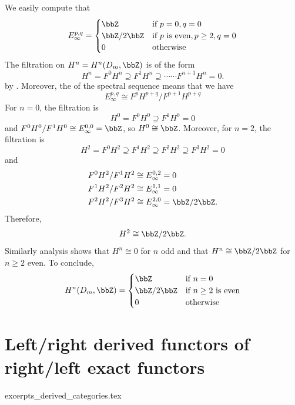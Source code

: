 \begin{example}
    We easily compute that 
    $$E_\infty^{p,q} = \begin{cases} \bbZ &\text{if } p = 0, q = 0 \\ \bbZ / 2 \bbZ &\text{if } p \text{ is even}, p \geq 2, q = 0 \\ 0 &\text{otherwise} \end{cases} $$
    The filtration on $H^n = H^n(D_m, \bbZ)$ is of the form 
    $$H^n = F^0 H^n \supseteq F^1 H^n \supseteq \cdots \cdots F^{n+1} H^n = 0.$$
    by . Moreover, the  of the spectral sequence means that we have 
    $$E^{p,q}_\infty \cong F^{p} H^{p+q} / F^{p+1} H^{p+q}$$
    For $n = 0$, the filtration is 
    $$H^0 = F^0 H^0 \supseteq F^1 H^0 = 0$$
    and $F^0 H^{0} / F^1 H^0 \cong E^{0,0}_\infty = \bbZ$, so $H^0 \cong \bbZ$. Moreover, for $n = 2$, the filtration is 
    $$H^2 = F^0 H^2 \supseteq F^1 H^2 \supseteq F^2 H^2 \supseteq F^3 H^2 = 0$$
    and 
    \begin{align*}
    F^0 H^2 / F^1 H^2 \cong E_\infty^{0,2} &= 0 \\ 
    F^1 H^2 / F^2 H^2 \cong E_\infty^{1,1} &= 0 \\ 
    F^2 H^2 / F^3 H^2 \cong E_\infty^{2,0} &= \bbZ/2\bbZ.
    \end{align*}
    Therefore, 
    $$H^2 \cong \bbZ/2\bbZ.$$
    Similarly analysis shows that $H^n \cong 0$ for $n$ odd and that $H^n \cong \bbZ/2\bbZ$ for $n \geq 2$ even. 
    To conclude, 
    $$H^n(D_m, \bbZ) = \begin{cases} \bbZ &\text{if } n = 0 \\ \bbZ / 2 \bbZ &\text{if } n \geq 2 \text{ is even} \\ 0 &\text{otherwise} \end{cases}$$

\end{example}




\section{Left/right derived functors of right/left exact functors}

{excerpts_derived_categories.tex}

\newpage

